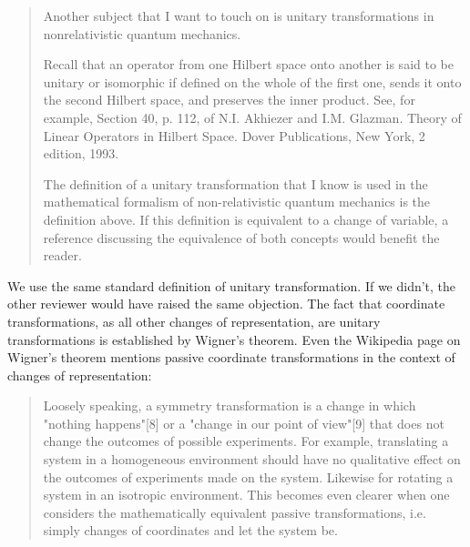 \documentclass[11pt, executivepaper]{article}
\begin{document}
\begin{quote}
	Another subject that I want to touch on is unitary transformations in nonrelativistic
	quantum mechanics.
	
	Recall that an operator from one Hilbert space onto another is said to be
	unitary or isomorphic if defined on the whole of the first one, sends it onto the
	second Hilbert space, and preserves the inner product. See, for example, Section
	40, p. 112, of N.I. Akhiezer and I.M. Glazman. Theory of Linear Operators in
	Hilbert Space. Dover Publications, New York, 2 edition, 1993.
	
	The definition of a unitary transformation that I know is used in the mathematical
	formalism of non-relativistic quantum mechanics is the definition above.
	If this definition is equivalent to a change of variable, a reference discussing the
	equivalence of both concepts would benefit the reader.
\end{quote}
We use the same standard definition of unitary transformation. If we didn't, the other reviewer would have raised the same objection. The fact that coordinate transformations, as all other changes of representation, are unitary transformations is established by Wigner's theorem. Even the Wikipedia page on Wigner's theorem mentions passive coordinate transformations in the context of changes of representation:
\begin{quote}
	Loosely speaking, a symmetry transformation is a change in which "nothing happens"[8] or a "change in our point of view"[9] that does not change the outcomes of possible experiments. For example, translating a system in a homogeneous environment should have no qualitative effect on the outcomes of experiments made on the system. Likewise for rotating a system in an isotropic environment. This becomes even clearer when one considers the mathematically equivalent passive transformations, i.e. simply changes of coordinates and let the system be.
\end{quote}
\end{document}
